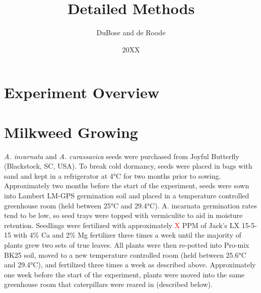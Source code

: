 \documentclass{article}
\title{Detailed Methods}
\author{DuBose and de Roode}
\date{20XX}
\begin{document}
\maketitle

\begin{multicols}{2}
    \section{Experiment Overview}

    \section{Milkweed Growing}
    \indent \emph{A. incarnata} and \emph{A. curassavica} seeds were purchased from Joyful Butterfly (Blackstock, SC, USA). To break cold dormancy, 
    seeds were placed in bags with sand and kept in a refrigerator at 4°C for two months prior to sowing. 
    Approximately two months before the start of the experiment, seeds were sown into Lambert LM-GPS germination soil and 
    placed in a temperature controlled greenhouse room (held between 25°C and 29.4°C). A. incarnata germination rates tend to be 
    low, so seed trays were topped with vermiculite to aid in moisture retention. Seedlings were fertilized with approximately 
    \textcolor{red}{X} PPM of Jack’s LX 15-5-15 with 4\% Ca and 2\% Mg fertilizer three times a week until the majority of plants grew two sets 
    of true leaves. All plants were then re-potted into Pro-mix BK25 soil, moved to a new temperature controlled room 
    (held between 25.6°C and 29.4°C), and fertilized three times a week as described above. Approximately one week before the 
    start of the experiment, plants were moved into the same greenhouse room that caterpillars were reared in (described below). 


\end{multicols}
\end{document}
